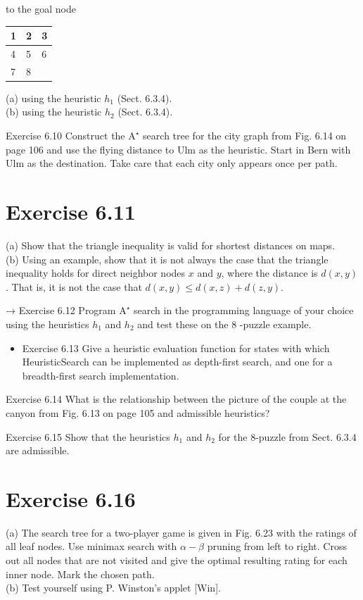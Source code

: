 \documentclass[10pt]{article}
\begin{document}
to the goal node

\begin{center}
\begin{tabular}{||l|l|l|}
\hline
1 & 2 & 3 \\
\hline
4 & 5 & 6 \\
\hline
7 & 8 &  \\
\hline
\end{tabular}
\end{center}

(a) using the heuristic $h_{1}$ (Sect. 6.3.4).\\
(b) using the heuristic $h_{2}$ (Sect. 6.3.4).

Exercise 6.10 Construct the $\mathrm{A}^{\star}$ search tree for the city graph from Fig. 6.14 on page 106 and use the flying distance to Ulm as the heuristic. Start in Bern with Ulm as the destination. Take care that each city only appears once per path.

\section*{Exercise 6.11}
(a) Show that the triangle inequality is valid for shortest distances on maps.\\
(b) Using an example, show that it is not always the case that the triangle inequality holds for direct neighbor nodes $x$ and $y$, where the distance is $d(x, y)$. That is, it is not the case that $d(x, y) \leq d(x, z)+d(z, y)$.

→ Exercise 6.12 Program $\mathrm{A}^{\star}$ search in the programming language of your choice using the heuristics $h_{1}$ and $h_{2}$ and test these on the 8 -puzzle example.

\begin{itemize}
  \item Exercise 6.13 Give a heuristic evaluation function for states with which HeuristicSearch can be implemented as depth-first search, and one for a breadth-first search implementation.
\end{itemize}

Exercise 6.14 What is the relationship between the picture of the couple at the canyon from Fig. 6.13 on page 105 and admissible heuristics?

Exercise 6.15 Show that the heuristics $h_{1}$ and $h_{2}$ for the 8-puzzle from Sect. 6.3.4 are admissible.

\section*{Exercise 6.16}
(a) The search tree for a two-player game is given in Fig. 6.23 with the ratings of all leaf nodes. Use minimax search with $\alpha-\beta$ pruning from left to right. Cross out all nodes that are not visited and give the optimal resulting rating for each inner node. Mark the chosen path.\\[0pt]
(b) Test yourself using P. Winston's applet [Win].
\end{document}
